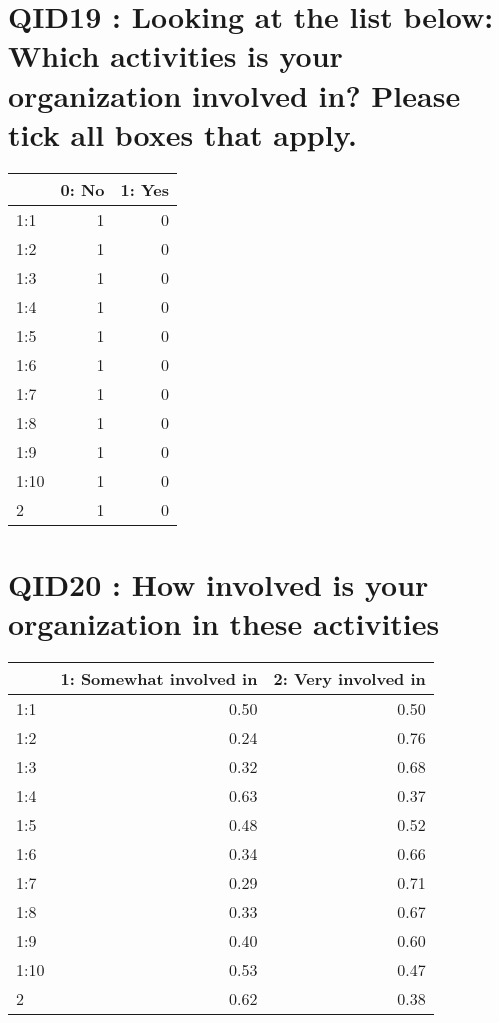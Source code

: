 \documentclass[]{article}
\begin{document}
\section{QID19 : Looking at the list below: Which activities is your
organization involved in? Please tick all boxes that
apply.}\label{qid19-looking-at-the-list-below-which-activities-is-your-organization-involved-in-please-tick-all-boxes-that-apply.}

\begin{table}[H]
\centering\begingroup\fontsize{30}{32}\selectfont

\begin{tabular}{l|r|r}
\hline
  & 0: No &  1: Yes\\
\hline
1:1 & 1 & 0\\
\hline
1:2 & 1 & 0\\
\hline
1:3 & 1 & 0\\
\hline
1:4 & 1 & 0\\
\hline
1:5 & 1 & 0\\
\hline
1:6 & 1 & 0\\
\hline
1:7 & 1 & 0\\
\hline
1:8 & 1 & 0\\
\hline
1:9 & 1 & 0\\
\hline
1:10 & 1 & 0\\
\hline
2 & 1 & 0\\
\hline
\end{tabular}
\endgroup{}
\end{table}

\section{QID20 : How involved is your organization in these
activities}\label{qid20-how-involved-is-your-organization-in-these-activities}

\begin{table}[H]
\centering\begingroup\fontsize{30}{32}\selectfont

\begin{tabular}{l|r|r}
\hline
  & 1: Somewhat involved in &  2: Very involved in\\
\hline
1:1 & 0.50 & 0.50\\
\hline
1:2 & 0.24 & 0.76\\
\hline
1:3 & 0.32 & 0.68\\
\hline
1:4 & 0.63 & 0.37\\
\hline
1:5 & 0.48 & 0.52\\
\hline
1:6 & 0.34 & 0.66\\
\hline
1:7 & 0.29 & 0.71\\
\hline
1:8 & 0.33 & 0.67\\
\hline
1:9 & 0.40 & 0.60\\
\hline
1:10 & 0.53 & 0.47\\
\hline
2 & 0.62 & 0.38\\
\hline
\end{tabular}
\endgroup{}
\end{table}
\end{document}
